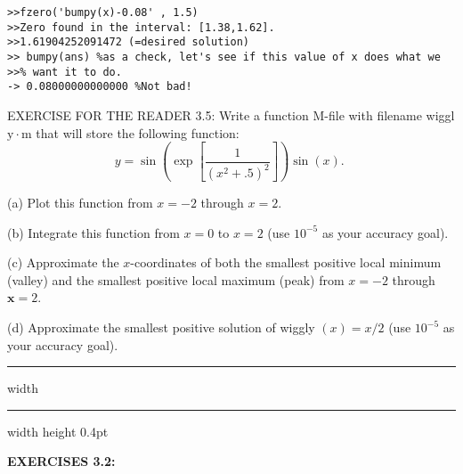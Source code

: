 \documentclass[../main.tex]{subfiles}
\begin{document}
\begin{verbatim}
>>fzero('bumpy(x)-0.08' , 1.5)
>>Zero found in the interval: [1.38,1.62].
>>1.61904252091472 (=desired solution)
>> bumpy(ans) %as a check, let's see if this value of x does what we
>>% want it to do.
-> 0.08000000000000 %Not bad!
\end{verbatim}

EXERCISE FOR THE READER 3.5: Write a function M-file with filename wiggl $\mathrm{y} \cdot \mathrm{m}$ that will store the following function:
$$
y=\sin \left(\exp \left[\frac{1}{\left(x^{2}+.5\right)^{2}}\right]\right) \sin (x) \text {. }
$$

(a) Plot this function from $x=-2$ through $x=2$.

(b) Integrate this function from $x=0$ to $x=2$ (use $10^{-5}$ as your accuracy goal).

(c) Approximate the $x$-coordinates of both the smallest positive local minimum (valley) and the smallest positive local maximum (peak)
 from $x=-2$ through $\boldsymbol{x}=2$. 
 
(d) Approximate the smallest positive solution of wiggly $(x)=x / 2$ (use $10^{-5}$ as your accuracy goal).\\


\hrule width \hsize \kern 1pt \hrule width \hsize height 0.4pt

\hspace{0.1cm}

\textbf{EXERCISES 3.2: }
\end{document}
